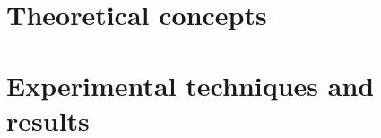 





\prefrontmatter

\cleartoevenpage

\clearforchapter

\frontmatter





\clearforchapter
{} %
\tableofcontents*
\clearforchapter
\mainmatter

\part{Theoretical concepts}

\part{Experimental techniques and results}



\appendixpage\appendix
\pagestyle{appruled} %



\backmatter
\pagestyle{myruled} %





 

